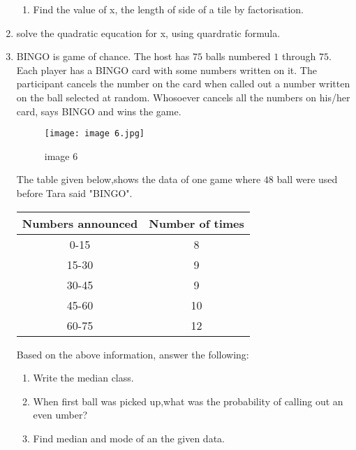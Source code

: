 \documentclass[12pt,-letter paper]{article}
\begin{document}
\begin{enumerate}
\begin{enumerate}
\item Find the value of x, the length of side of a tile by factorisation.
\end{enumerate}
\item solve the quadratic equcation for x, using quardratic formula.
\newpage
\item BINGO is game of chance. The host has $75$ balls numbered $1$ through $75$. Each player has a BINGO card with some numbers written on it.
The participant cancels the number on the card when called out a number written on the ball selected at random. Whosoever cancels all the numbers on his/her card, says BINGO and wins the game.

\begin{figure}[!ht]
\centering
\texttt{[image: image 6.jpg]}
\label{fig:image 6}
\caption{image 6}
\end{figure}

\text The table given below,shows the data of one game where $48$ ball were used before Tara said "BINGO".
\begin{center}
\begin{tabular}{|c|c|}
\hline
Numbers announced & Number of times \\
\hline
0-15 & 8 \\
\hline
15-30 & 9 \\
\hline
30-45 & 9 \\
\hline
45-60 & 10 \\
\hline
60-75 & 12 \\
\hline
\end{tabular}
\end{center}
 Based on the above information, answer the following:\\
\begin{enumerate}
\item Write the median class.\\
\item When first ball was picked up,what was the probability of calling out an even umber?\\
\item Find median and mode of an the given data.
\end{enumerate}


\end{enumerate}
\end{document}

